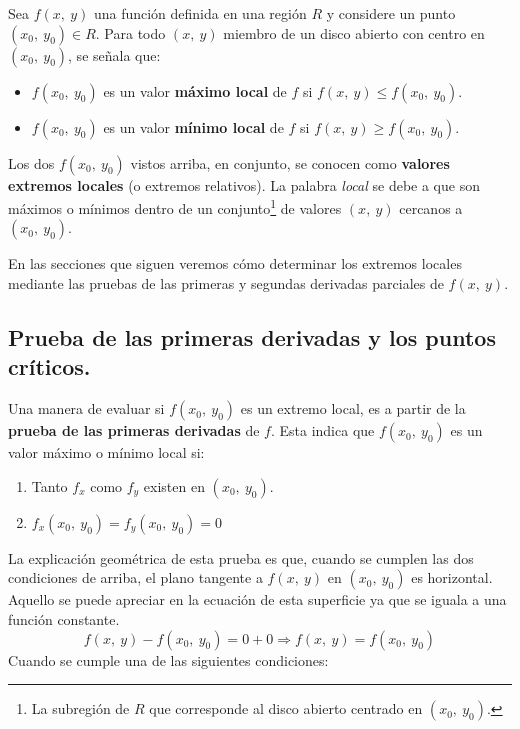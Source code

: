 \documentclass[12pt]{article}
\begin{document}
Sea $f(x, \ y)$ una función definida en una región $R$ y considere un punto $(x_{0}, \ y_{0}) \in R$. Para todo $(x, \ y)$ miembro de un disco abierto con centro en $(x_{0}, \ y_{0})$, se señala que:

\begin{itemize}
\item $f(x_{0}, \ y_{0})$ es un valor \textbf{máximo local} de $f$ si $f(x, \ y) \leq f(x_{0}, \ y_{0})$.

\item $f(x_{0}, \ y_{0})$ es un valor \textbf{mínimo local} de $f$ si $f(x, \ y) \geq f(x_{0}, \ y_{0})$.
\end{itemize}

Los dos $f(x_{0}, \ y_{0})$ vistos arriba, en conjunto, se conocen como \textbf{valores extremos locales} (o extremos relativos). La palabra \textit{local} se debe a que son máximos o mínimos dentro de un conjunto\footnote{La subregión de $R$ que corresponde al disco abierto centrado en $(x_{0}, \ y_{0})$.} de valores $(x, \ y)$ cercanos a $(x_{0}, \ y_{0})$.

En las secciones que siguen veremos cómo determinar los extremos locales mediante las pruebas de las primeras y segundas derivadas parciales de $f(x, \ y)$.

\subsection{Prueba de las primeras derivadas y los puntos críticos.}

Una manera de evaluar si $f(x_{0}, \ y_{0})$ es un extremo local, es a partir de la \textbf{prueba de las primeras derivadas} de $f$. Esta indica que $f(x_{0}, \ y_{0})$ es un valor máximo o mínimo local si:

\begin{enumerate}
\item Tanto $f_{x}$ como $f_{y}$ existen en $(x_{0}, \ y_{0})$.
\item $f_{x}(x_{0}, \ y_{0}) = f_{y}(x_{0}, \ y_{0}) = 0$
\end{enumerate}

La explicación geométrica de esta prueba es que, cuando se cumplen las dos condiciones de arriba, el plano tangente a $f(x, \ y)$ en $(x_{0}, \ y_{0})$ es horizontal. Aquello se puede apreciar en la ecuación de esta superficie ya que se iguala a una función constante.
\[
  f(x, \ y) - f(x_{0}, \ y_{0}) = 0 + 0 \Longrightarrow f(x, \ y) = f(x_{0}, \ y_{0})
\]
Cuando se cumple una de las siguientes condiciones:
\end{document}
